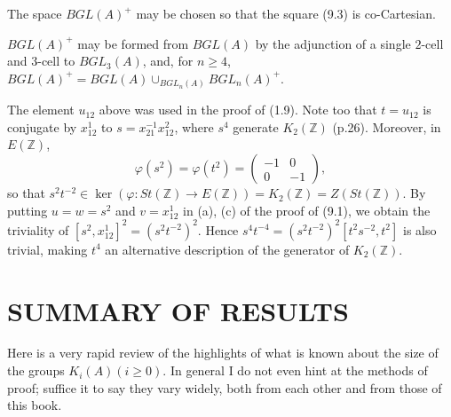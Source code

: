 \begin{corollary}
  The space $BGL(A)^+$ may be chosen so that the square (9.3) is co-Cartesian.
\end{corollary}
\begin{corollary}
  $BGL(A)^+$ may be formed from $BGL(A)$ by the adjunction of a single $2$-cell and $3$-cell to $BGL_3(A)$, and, for $n\geqslant 4$, $BGL(A)^+=BGL(A)\cup_{BGL_n(A)}BGL_n(A)^+$.
\end{corollary}
The element $u_{12}$ above was used in the proof of (1.9). Note too that $t=u_{12}$ is conjugate by $x_{12}^1$ to $s=x_{21}^{-1}x_{12}^2$, where $s^4$ generate $K_2(\mathbb{Z})$ (p.26). Moreover, in $E(\mathbb{Z})$,
\[\varphi(s^2)=\varphi(t^2)= \begin{pmatrix}-1 &0 \\ 0 & -1\end{pmatrix},\]
so that $s^2 t^{-2} \in \ker(\varphi\colon   St(\mathbb{Z})\longrightarrow E(\mathbb{Z}))=K_2(\mathbb{Z})=Z(St(\mathbb{Z}))$.
 By putting $u=w=s^2$ and $v=x_{12}^1$ in (a), (c) of the proof of (9.1), we obtain the triviality of $[s^2, x_{12}^1]^2=(s^2 t^{-2})^2$. Hence $s^4 t^{-4}=(s^2 t^{-2})^2 [t^2 s^{-2}, t^2]$ is also trivial, making $t^4$ an alternative description of the generator of $K_2(\mathbb{Z})$.
\section*{SUMMARY OF RESULTS }
Here is a very rapid review of the highlights of what is known about the size of the groups $K_i(A) (i\geqslant 0)$. In general I do not even hint at the methods of proof; suffice it to say they vary widely, both from each other and from those of this book.

